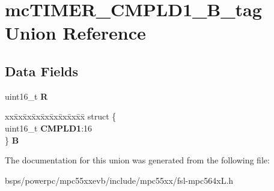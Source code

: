 \hypertarget{unionmcTIMER__CMPLD1__16B__tag}{}\section{mc\+T\+I\+M\+E\+R\+\_\+\+C\+M\+P\+L\+D1\+\_\+B\+\_\+tag Union Reference}
\label{unionmcTIMER__CMPLD1__16B__tag}
\subsection*{Data Fields}
\begin{DoxyCompactItemize}
\item 
\mbox{\label{unionmcTIMER__CMPLD1__16B__tag_ade0f0b3dbd890d6551721afbae5afa42}} 
uint16\+\_\+t {\bfseries R}
\item 
\mbox{\label{unionmcTIMER__CMPLD1__16B__tag_ac8e497d85f43ab468b235b6176b82680}} 
\begin{tabbing}
xx\=xx\=xx\=xx\=xx\=xx\=xx\=xx\=xx\=\kill
struct \{\\
\>uint16\_t {\bfseries CMPLD1}:16\\
\} {\bfseries B}\\

\end{tabbing}\end{DoxyCompactItemize}


The documentation for this union was generated from the following file\+:\begin{DoxyCompactItemize}
\item 
bsps/powerpc/mpc55xxevb/include/mpc55xx/fsl-\/mpc564x\+L.\+h\end{DoxyCompactItemize}
